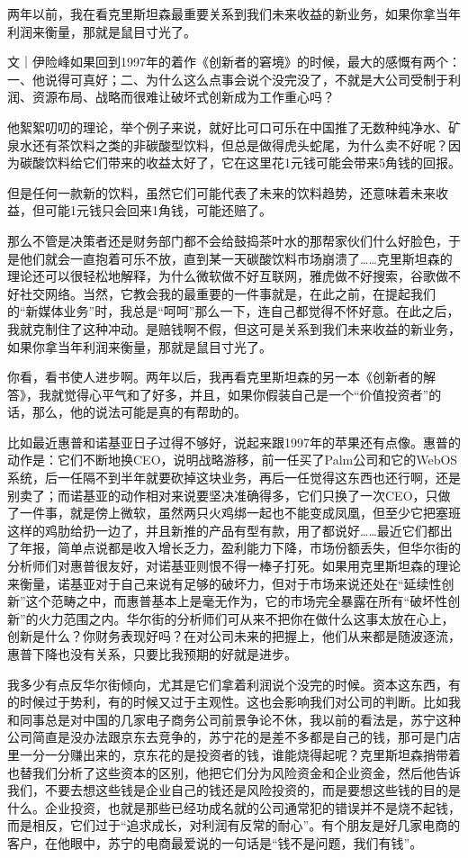 两年以前，我在看克里斯坦森最重要关系到我们未来收益的新业务，如果你拿当年利润来衡量，那就是鼠目寸光了。

文｜伊险峰如果回到1997年的着作《创新者的窘境》的时候，最大的感慨有两个：一、他说得可真好；二、为什么这么点事会说个没完没了，不就是大公司受制于利润、资源布局、战略而很难让破坏式创新成为工作重心吗？

他絮絮叨叨的理论，举个例子来说，就好比可口可乐在中国推了无数种纯净水、矿泉水还有茶饮料之类的非碳酸型饮料，但总是做得虎头蛇尾，为什么卖不好呢？因为碳酸饮料给它们带来的收益太好了，它在这里花1元钱可能会带来5角钱的回报。

但是任何一款新的饮料，虽然它们可能代表了未来的饮料趋势，还意味着未来收益，但可能1元钱只会回来1角钱，可能还赔了。

那么不管是决策者还是财务部门都不会给鼓捣茶叶水的那帮家伙们什么好脸色，于是他们就会一直抱着可乐不放，直到某一天碳酸饮料市场崩溃了\ldots{}\ldots{}克里斯坦森的理论还可以很轻松地解释，为什么微软做不好互联网，雅虎做不好搜索，谷歌做不好社交网络。当然，它教会我的最重要的一件事就是，在此之前，在提起我们的``新媒体业务''时，我总是``呵呵''那么一下，连自己都觉得不怀好意。在此之后，我就克制住了这种冲动。是赔钱啊不假，但这可是关系到我们未来收益的新业务，如果你拿当年利润来衡量，那就是鼠目寸光了。

你看，看书使人进步啊。两年以后，我再看克里斯坦森的另一本《创新者的解答》，我就觉得心平气和了好多，并且，如果你假装自己是一个``价值投资者''的话，那么，他的说法可能是真的有帮助的。

比如最近惠普和诺基亚日子过得不够好，说起来跟1997年的苹果还有点像。惠普的动作是：它们不断地换CEO，说明战略游移，前一任买了Palm公司和它的WebOS系统，后一任隔不到半年就要砍掉这块业务，再后一任觉得这东西也还行啊，还是别卖了；而诺基亚的动作相对来说要坚决准确得多，它们只换了一次CEO，只做了一件事，就是傍上微软，虽然两只火鸡绑一起也不能变成凤凰，但至少它把塞班这样的鸡肋给扔一边了，并且新推的产品有型有款，用了都说好\ldots{}\ldots{}最近它们都出了年报，简单点说都是收入增长乏力，盈利能力下降，市场份额丢失，但华尔街的分析师们对惠普很友好，对诺基亚则恨不得一棒子打死。如果用克里斯坦森的理论来衡量，诺基亚对于自己来说有足够的破坏力，但对于市场来说还处在``延续性创新''这个范畴之中，而惠普基本上是毫无作为，它的市场完全暴露在所有``破坏性创新''的火力范围之内。华尔街的分析师们可从来不把你在做什么这事太放在心上，创新是什么？你财务表现好吗？在对公司未来的把握上，他们从来都是随波逐流，惠普下降也没有关系，只要比我预期的好就是进步。

我多少有点反华尔街倾向，尤其是它们拿着利润说个没完的时候。资本这东西，有的时候过于势利，有的时候又过于主观性。这也会影响我们对公司的判断。比如我和同事总是对中国的几家电子商务公司前景争论不休，我以前的看法是，苏宁这种公司简直是没办法跟京东去竞争的，苏宁花的是差不多都是自己的钱，那可是门店里一分一分赚出来的，京东花的是投资者的钱，谁能烧得起呢？克里斯坦森捎带着也替我们分析了这些资本的区别，他把它们分为风险资金和企业资金，然后他告诉我们，不要去想这些钱是企业自己的钱还是风险投资的，而是要想这些钱的目的是什么。企业投资，也就是那些已经功成名就的公司通常犯的错误并不是烧不起钱，而是相反，它们过于``追求成长，对利润有反常的耐心''。有个朋友是好几家电商的客户，在他眼中，苏宁的电商最爱说的一句话是``钱不是问题，我们有钱''。

